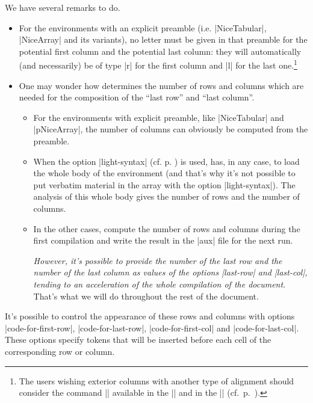 \documentclass[dvipsnames]{article}%
\begin{document}
\bigskip
We have several remarks to do.
\begin{itemize}[beginpenalty=10000]
\item For the environments with an explicit preamble (i.e. |{NiceTabular}|,
|{NiceArray}| and its variants), no letter must be given in that preamble for
the potential first column and the potential last column: they will
automatically (and necessarily) be of type |r| for the first column and |l|
for the last one.\footnote{The users wishing exterior columns with another
type of alignment should consider the command |\SubMatrix| available in the
|\CodeAfter| and in the |\CodeBefore| (cf.~p.~\pageref{sub-matrix}).}
\item One may wonder how  determines the number of rows and
columns which are needed for the composition of the ``last row'' and ``last
column''.
\begin{itemize}
\item For the environments with explicit preamble, like |{NiceTabular}| and
|{pNiceArray}|, the number of columns can obviously be computed from the
preamble.

\item When the option |light-syntax| (cf. p. \pageref{light-syntax}) is used,
 has, in any case, to load the whole body of the environment
(and that's why it's not possible to put verbatim material in the array with
the option |light-syntax|). The analysis of this whole body gives the number
of rows and the number of columns.

\item In the other cases,  compute the number of rows and
columns during the first compilation and write the result in the |aux| file
for the next run.

\textsl{However, it's possible to provide the number of the last row and the
number of the last column as values of the options |last-row| and |last-col|,
tending to an acceleration of the whole compilation of the document.} That's
what we will do throughout the rest of the document.
\end{itemize}
\end{itemize}

\bigskip
{}
It's possible to control the appearance of these rows and columns with options
|code-for-first-row|, |code-for-last-row|, |code-for-first-col| and
|code-for-last-col|. These options specify tokens that will be inserted before
each cell of the corresponding row or column. 
\end{document}
